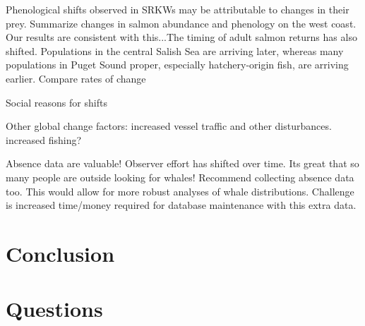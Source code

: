 \documentclass{article}
\begin{document}
\par Phenological shifts observed in SRKWs may be attributable to changes in their prey. Summarize changes in salmon abundance and phenology on the west coast. Our results are consistent with this...The timing of adult salmon returns has also shifted. Populations in the central Salish Sea are arriving later, whereas many populations in Puget Sound proper, especially hatchery-origin fish, are arriving earlier. Compare rates of change
\par Social reasons for shifts
\par Other global change factors: increased vessel traffic and other disturbances. increased fishing?
\par Absence data are valuable! Observer effort has shifted over time. Its great that so many people are outside looking for whales! Recommend collecting absence data too. This would allow for more robust analyses of whale distributions. Challenge is increased time/money required for database maintenance with this extra data.

\section*{Conclusion}

\section*{Questions}
\end{document}
